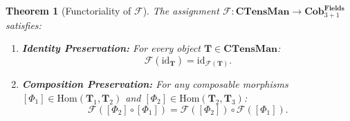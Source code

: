 \documentclass[11pt,a4paper,reqno]{amsart}
\newtheorem{theorem}{Theorem}[section]
\theoremstyle{definition}
\numberwithin{equation}{section}
\newcommand{\CTens}{\mathbf{CTensMan}}
\newcommand{\Cob}{\mathbf{Cob}_{3+1}^{\mathbf{Fields}}}
\begin{document}
\begin{theorem}[Functoriality of $\mathcal{F}$] \label{thm:functoriality}
The assignment $\mathcal{F}: \CTens \to \Cob$ satisfies:
\begin{enumerate}
    \item \textbf{Identity Preservation:} For every object $\mathbf{T} \in \CTens$:
    \begin{equation}
        \mathcal{F}(\mathrm{id}_{\mathbf{T}}) = \mathrm{id}_{\mathcal{F}(\mathbf{T})}.
    \end{equation}
    \item \textbf{Composition Preservation:} For any composable morphisms $[\Phi_1] \in \mathrm{Hom}(\mathbf{T}_1, \mathbf{T}_2)$ and $[\Phi_2] \in \mathrm{Hom}(\mathbf{T}_2, \mathbf{T}_3)$:
    \begin{equation}
        \mathcal{F}([\Phi_2] \circ [\Phi_1]) = \mathcal{F}([\Phi_2]) \circ \mathcal{F}([\Phi_1]). \label{eq:composition}
    \end{equation}
\end{enumerate}
\end{theorem}
\end{document}
